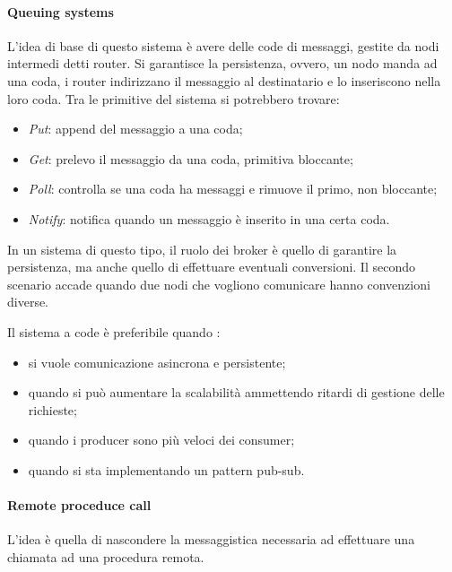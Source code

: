 \paragraph{Queuing systems}
L'idea di base di questo sistema è avere delle code di messaggi, gestite 
da nodi intermedi detti router. 
Si garantisce la persistenza, ovvero, un nodo manda ad una coda, i router 
indirizzano il messaggio al destinatario e lo inseriscono nella loro coda.
Tra le primitive del sistema si potrebbero trovare:
\begin{itemize}
    \item \emph{Put}: append del messaggio a una coda;
    \item \emph{Get}: prelevo il messaggio da una coda, primitiva bloccante;
    \item \emph{Poll}: controlla se una coda ha messaggi e rimuove il primo, non bloccante;
    \item \emph{Notify}: notifica quando un messaggio è inserito in una certa coda.
\end{itemize}
In un sistema di questo tipo, il ruolo dei broker è quello di garantire la persistenza, 
ma anche quello di effettuare eventuali conversioni. Il secondo scenario accade quando 
due nodi che vogliono comunicare hanno convenzioni diverse. 

Il sistema a code è preferibile quando :
\begin{itemize}
    \item si vuole comunicazione asincrona e persistente;
    \item quando si può aumentare la scalabilità ammettendo ritardi di gestione delle richieste;
    \item quando i producer sono più veloci dei consumer;
    \item quando si sta implementando un pattern pub-sub.
\end{itemize}

\paragraph{Remote proceduce call}
L'idea è quella di nascondere la messaggistica necessaria ad effettuare una 
chiamata ad una procedura remota.

